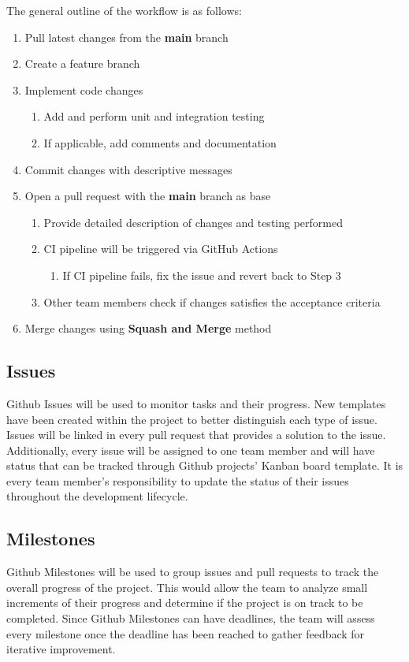 \documentclass{article}
\begin{document}
\noindent The general outline of the workflow is as follows:

\begin{enumerate}
  \item Pull latest changes from the \textbf{main} branch
  \item Create a feature branch
  \item Implement code changes
  \begin{enumerate}
    \item Add and perform unit and integration testing
    \item If applicable, add comments and documentation
  \end{enumerate}
  \item Commit changes with descriptive messages
  \item Open a pull request with the \textbf{main} branch as base
  \begin{enumerate}
    \item Provide detailed description of changes and testing performed
    \item CI pipeline will be triggered via GitHub Actions
    \begin{enumerate}
      \item  If CI pipeline fails, fix the issue and revert back to Step 3
    \end{enumerate}
    \item Other team members check if changes satisfies the acceptance criteria
  \end{enumerate}
  \item Merge changes using \textbf{Squash and Merge} method
\end{enumerate}


\subsection{Issues}
Github Issues will be used to monitor tasks and their progress. New templates have been created within the project to better distinguish each type of issue. Issues will be linked in every pull request that provides a solution to the issue. Additionally, every issue will be assigned to one team member and will have status that can be tracked through Github projects’ Kanban board template. It is every team member’s responsibility to update the status of their issues throughout the development lifecycle.

\subsection{Milestones}
Github Milestones will be used to group issues and pull requests to track the overall progress of the project. This would allow the team to analyze small increments of their progress and determine if the project is on track to be completed. Since Github Milestones can have deadlines, the team will assess every milestone once the deadline has been reached to gather feedback for iterative improvement.
\end{document}
